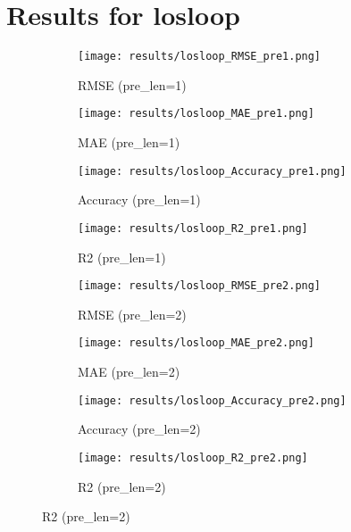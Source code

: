 \documentclass{article}
\begin{document}
\section*{Results for losloop}
\begin{figure}[htbp]
    \centering
    \begin{subfigure}[b]{0.24\textwidth}
        \texttt{[image: results/losloop\_RMSE\_pre1.png]}
        \caption{RMSE (pre\_len=1)}
    \end{subfigure}
    \begin{subfigure}[b]{0.24\textwidth}
        \texttt{[image: results/losloop\_MAE\_pre1.png]}
        \caption{MAE (pre\_len=1)}
    \end{subfigure}
    \begin{subfigure}[b]{0.24\textwidth}
        \texttt{[image: results/losloop\_Accuracy\_pre1.png]}
        \caption{Accuracy (pre\_len=1)}
    \end{subfigure}
    \begin{subfigure}[b]{0.24\textwidth}
        \texttt{[image: results/losloop\_R2\_pre1.png]}
        \caption{R2 (pre\_len=1)}
    \end{subfigure}

    \begin{subfigure}[b]{0.24\textwidth}
        \texttt{[image: results/losloop\_RMSE\_pre2.png]}
        \caption{RMSE (pre\_len=2)}
    \end{subfigure}
    \begin{subfigure}[b]{0.24\textwidth}
        \texttt{[image: results/losloop\_MAE\_pre2.png]}
        \caption{MAE (pre\_len=2)}
    \end{subfigure}
    \begin{subfigure}[b]{0.24\textwidth}
        \texttt{[image: results/losloop\_Accuracy\_pre2.png]}
        \caption{Accuracy (pre\_len=2)}
    \end{subfigure}
    \begin{subfigure}[b]{0.24\textwidth}
        \texttt{[image: results/losloop\_R2\_pre2.png]}
        \caption{R2 (pre\_len=2)}
    \end{subfigure}


\end{figure}
\end{document}
